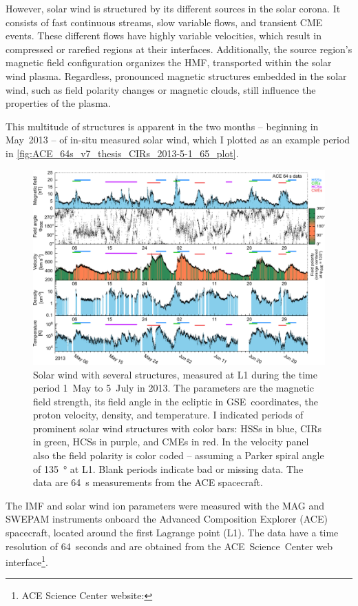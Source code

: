 However, solar wind is structured by its different sources in the solar corona. It consists of fast continuous streams, slow variable flows, and transient CME events. These different flows have highly variable velocities, which result in compressed or rarefied regions at their interfaces. Additionally, the source region's magnetic field configuration organizes the HMF, transported within the solar wind plasma. Regardless, pronounced magnetic structures embedded in the solar wind, such as field polarity changes or magnetic clouds, still influence the properties of the plasma.

This multitude of structures is apparent in the two months -- beginning in May~2013 -- of in-situ measured solar wind, which I plotted as an example period in \autoref{fig:ACE_64s_v7_thesis_CIRs_2013-5-1_65_plot}.
\begin{figure}[htb]
	\centering
	\includegraphics[width=\textwidth]{figures_of_mine/gnuplots/ACE_64s_v7_thesis_CIRs_2013-5-1_65_plot.pdf}
	\caption[]
	{Solar wind with several structures, measured at L1 during the time period 1~May to 5~July in 2013. The parameters are the magnetic field strength, its field angle in the ecliptic in GSE~coordinates, the proton velocity, density, and temperature. I indicated periods of prominent solar wind structures with color bars: HSSs in blue, CIRs in green, HCSs in purple, and CMEs in red. In the velocity panel also the field polarity is color coded -- assuming a Parker spiral angle of \SI{135}{\degree} at L1. Blank periods indicate bad or missing data. The data are 64~s measurements from the ACE spacecraft.}
	\label{fig:ACE_64s_v7_thesis_CIRs_2013-5-1_65_plot}
\end{figure}
The IMF and solar wind ion parameters were measured with the MAG and SWEPAM instruments onboard the Advanced Composition Explorer (ACE) spacecraft, located around the first Lagrange point (L1). The data have a time resolution of 64~seconds and are obtained from the ACE~Science~Center web interface\footnote{ACE Science Center website: }.

